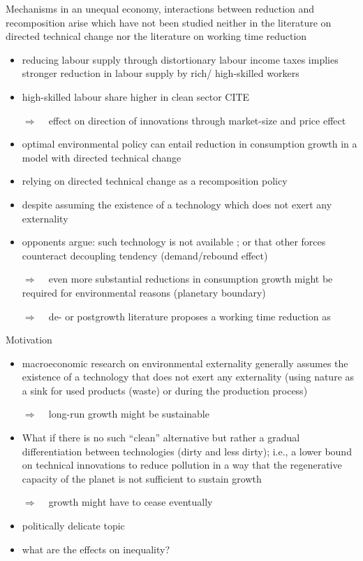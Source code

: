 \documentclass[11pt,aspectratio=169]{beamer}
\newcommand{\ar}{$\Rightarrow$ \ }
\begin{document}
\begin{frame}{Mechanisms}
 in an unequal economy, interactions between reduction and recomposition arise which have not been studied neither in the literature on directed technical change nor the literature on working time reduction
\begin{itemize}
	\item reducing labour supply through distortionary labour income taxes implies stronger reduction in labour supply by rich/ high-skilled workers
	\item high-skilled labour share higher in clean sector CITE
	\item[\ar] effect on direction of innovations through market-size and  price effect
\end{itemize}
\begin{itemize}
\item optimal environmental policy can entail reduction in consumption growth  \citep[e.g.,][]{Acemoglu2012TheChange} in a model with directed technical change
\item relying on directed technical change as a recomposition policy
\item despite assuming the existence of a technology which does not exert any externality
\item opponents argue: such technology is not available \citep{Dasgupta2021}; or that other forces counteract decoupling tendency (demand/rebound effect)
\item[\ar] even more substantial reductions in consumption growth might be required for environmental reasons (planetary boundary)
\item[\ar] de- or postgrowth literature proposes a working time reduction as  
\end{itemize}
\end{frame}

\begin{frame}[allowframebreaks]{Motivation}
\begin{itemize}
\item macroeconomic research on environmental externality generally assumes the existence of a technology that does not exert any externality (using nature as a sink for used products (waste) or during the production process)
\item[\ar] long-run growth might be sustainable \citep{Acemoglu2012TheChange}
\item What if there is no such ``clean'' alternative but rather a gradual differentiation between technologies (dirty and less dirty); i.e., a lower bound on technical  innovations to reduce pollution in a way that the regenerative capacity of the planet is not  sufficient to sustain growth
\item[\ar] growth might have to cease eventually
\item politically delicate topic
\item what are the effects on inequality?
\end{itemize}
\end{frame}
\end{document}
